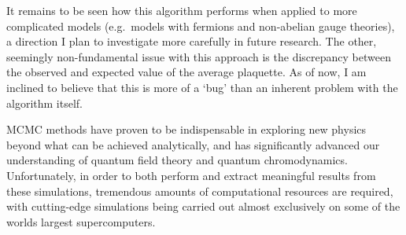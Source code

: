 \documentclass[../main.tex]{subfiles}
\begin{document}

%
%
%
%
%
%
It remains to be seen how this algorithm performs when applied to more complicated models (e.g.\ models with fermions
and non-abelian gauge theories), a direction I plan to investigate more carefully in future research.
%
The other, seemingly non-fundamental issue with this approach is the discrepancy between the observed and expected
value of the average plaquette.
%
As of now, I am inclined to believe that this is more of a `bug' than an inherent problem with the algorithm itself.

%
%
%
%

MCMC methods have proven to be indispensable in exploring new physics beyond what can be achieved analytically, and has
significantly advanced our understanding of quantum field theory and quantum chromodynamics.
%
%
Unfortunately, in order to both perform and  extract meaningful results from these simulations, tremendous amounts of
computational resources are required, with cutting-edge simulations being carried out almost exclusively on some of the
worlds largest supercomputers.
\end{document}
